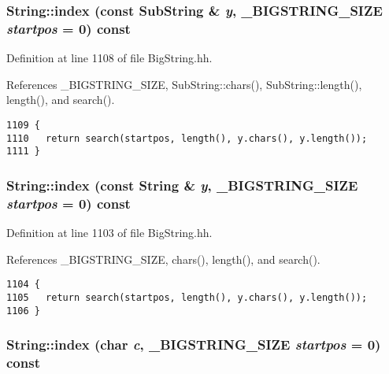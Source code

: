 \subsubsection{ String::index (const {\bf Sub\-String} \& {\em y}, {\bf \_\-BIGSTRING\_\-SIZE} {\em startpos} = 0) const\hspace{0.3cm}{\tt  [inline]}}\label{classString_a28}




Definition at line 1108 of file Big\-String.hh.

References \_\-BIGSTRING\_\-SIZE, Sub\-String::chars(), Sub\-String::length(), length(), and search().



\footnotesize\begin{verbatim}1109 {   
1110   return search(startpos, length(), y.chars(), y.length());
1111 }
\end{verbatim}\normalsize 
{}
\subsubsection{ String::index (const String \& {\em y}, {\bf \_\-BIGSTRING\_\-SIZE} {\em startpos} = 0) const\hspace{0.3cm}{\tt  [inline]}}\label{classString_a27}




Definition at line 1103 of file Big\-String.hh.

References \_\-BIGSTRING\_\-SIZE, chars(), length(), and search().



\footnotesize\begin{verbatim}1104 {   
1105   return search(startpos, length(), y.chars(), y.length());
1106 }
\end{verbatim}\normalsize 
{}
\subsubsection{ String::index (char {\em c}, {\bf \_\-BIGSTRING\_\-SIZE} {\em startpos} = 0) const\hspace{0.3cm}{\tt  [inline]}}\label{classString_a26}




